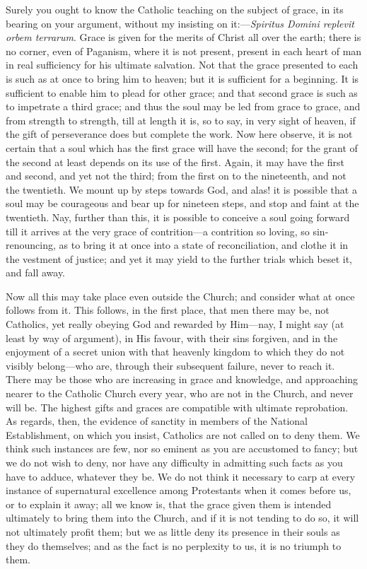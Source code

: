 Surely you ought to know the Catholic teaching on the subject of
grace, in its bearing on your argument, without my insisting on it:—\emph{Spiritus
Domini replevit orbem terrarum}. Grace is given for the merits of
Christ all over the earth; there is no corner, even of Paganism, where
it is not present, present in each heart of man in real sufficiency
for his ultimate salvation. Not that the grace presented to each is
such as at once to bring him to heaven; but it is sufficient for a
beginning. It is sufficient to enable him to plead for other grace;
and that second grace is such as to impetrate a third grace; and thus
the soul may be led from grace to grace, and from strength to
strength, till at length it is, so to say, in very sight of heaven, if
the gift of perseverance does but complete the work. Now here observe,
it is not certain that a soul which has the first grace will have the
second; for the grant of the second at least depends on its use of the
first. Again, it may have the first and second, and yet not the third;
from the first on to the nineteenth, and not the twentieth. We mount
up by steps towards God, and alas! it is possible that a soul may be
courageous and bear up for nineteen steps, and stop and faint at the
twentieth. Nay, further than this, it is possible to conceive a soul
going forward till it arrives at the very grace of contrition—a
contrition so loving, so sin-renouncing, as to bring it at once into a
state of reconciliation, and clothe it in the vestment of justice; and
yet it may yield to the further trials which beset it, and fall away.

Now all this may take place even outside the Church; and consider
what at once follows from it. This follows, in the first place, that
men there may be, not Catholics, yet really obeying God and rewarded
by Him—nay, I might say (at least by way of argument), in His favour,
with their sins forgiven, and in the enjoyment of a secret union with
that heavenly kingdom to which they do not visibly belong—who are,
through their subsequent failure, never to reach it. There may be
those who are increasing in grace and knowledge, and approaching
nearer to the Catholic Church every year, who are not in the Church,
and never will be. The highest gifts and graces are compatible with
ultimate reprobation. As regards, then, the evidence of sanctity in
members of the National Establishment, on which you insist, Catholics
are not called on to deny them. We think such instances are few, nor
so eminent as you are accustomed to fancy; but we do not wish to deny,
nor have any difficulty in admitting such facts as you have to adduce,
whatever they be. We do not think it necessary to carp at every
instance of supernatural excellence among Protestants when it comes
before us, or to explain it away; all we know is, that the grace given
them is intended ultimately to bring them into the Church, and if it
is not tending to do so, it will not ultimately profit them; but we as
little deny its presence in their souls as they do themselves; and as
the fact is no perplexity to us, it is no triumph to them.

